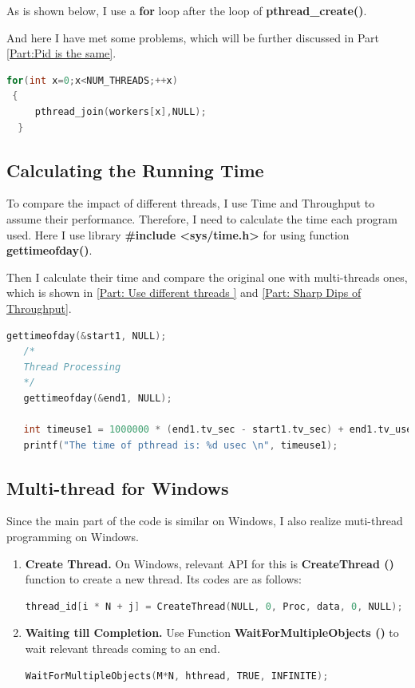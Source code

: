 \documentclass[12pt,a4paper]{article}
\begin{document}
As is shown below, I use a \textbf{for} loop after the loop of \textbf{pthread\_create()}.

And here I have met some problems, which will be further discussed in Part \ref{Part:Pid is the same}.

\begin{lstlisting}[language=C++]	
 for(int x=0;x<NUM_THREADS;++x)
 {
     pthread_join(workers[x],NULL);
  }
\end{lstlisting}
\subsection{Calculating the Running Time}

To compare the impact of different threads, I use Time and Throughput to assume their performance. Therefore, I need to calculate the time each program used. Here I use library \textbf{\#include <sys/time.h>} for using function \textbf{gettimeofday()}.

Then I calculate their time and compare the original one with multi-threads ones, which is shown in \ref{Part: Use different threads } and \ref{Part: Sharp Dips of Throughput}.
\begin{lstlisting}[language=C++]	
   gettimeofday(&start1, NULL);
   /*
   Thread Processing
   */
   gettimeofday(&end1, NULL);
   
   int timeuse1 = 1000000 * (end1.tv_sec - start1.tv_sec) + end1.tv_usec - start1.tv_usec;
   printf("The time of pthread is: %d usec \n", timeuse1);
\end{lstlisting}
\subsection{Multi-thread for Windows}
Since the main part of the code is similar on Windows, I also realize muti-thread programming on Windows.
\begin{enumerate}
	\item \textbf{Create Thread.} On Windows, relevant API for this is \textbf{CreateThread ()} function to create a new thread. Its codes are as follows:
	      \begin{lstlisting}[language = C++]
   thread_id[i * N + j] = CreateThread(NULL, 0, Proc, data, 0, NULL);
	\end{lstlisting}
	\item \textbf{Waiting till Completion.} Use Function \textbf{WaitForMultipleObjects ()} to wait relevant threads coming to an end.

	      \begin{lstlisting}[language = C++]
   WaitForMultipleObjects(M*N, hthread, TRUE, INFINITE);
	\end{lstlisting}

\end{enumerate}
\end{document}
